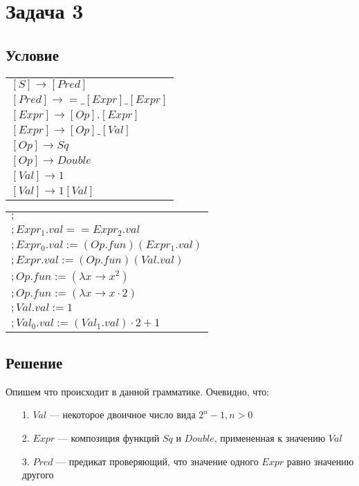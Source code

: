 \documentclass[a4paper, 14pt]{extarticle}
\begin{document}
\newpage

\section{Задача 3}

\subsection{Условие}
\begin{center}
  \begin{tabular}{l}
    $[S] \to [Pred]$ \\
    $[Pred] \to =\_[Expr]\_[Expr]$ \\
    $[Expr] \to [Op].[Expr]$ \\
    $[Expr] \to [Op]\_[Val]$ \\
    $[Op] \to Sq$ \\
    $[Op] \to Double$ \\
    $[Val] \to 1$ \\
    $[Val] \to 1[Val]$
  \end{tabular}
  \begin{tabular}{l}
    $;$ \\
    $; Expr_1.val == Expr_2.val$ \\
    $; Expr_0.val := (Op.fun)(Expr_1.val)$ \\
    $; Expr.val := (Op.fun)(Val.val)$ \\
    $; Op.fun := (\lambda x \to x^2)$ \\
    $; Op.fun := (\lambda x \to x \cdot 2)$ \\
    $; Val.val := 1$ \\
    $; Val_0.val := (Val_1.val) \cdot 2 + 1$
  \end{tabular}
\end{center}

\subsection{Решение}
Опишем что происходит в данной грамматике. Очевидно, что:
\begin{enumerate}
    \item [1.] $Val$ --- некоторое двоичное число вида $2^n - 1, n > 0$
    \item [2.] $Expr$ --- композиция функций $Sq$ и $Double$, примененная к значению $Val$
    \item [3.] $Pred$ --- предикат проверяющий, что значение одного $Expr$ равно значению другого
\end{enumerate}
\end{document}

